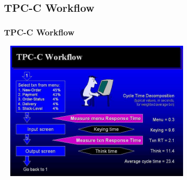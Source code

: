 \documentclass[12pt]{beamer}
\begin{document}
\subsection{TPC-C Workflow}
\begin{frame}[c]
\frametitle{TPC-C Workflow}

\centering
   \includegraphics[width=10cm, height=7cm]{images/workflow}

\end{frame}

\end{document}

